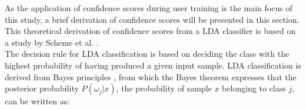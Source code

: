As the application of confidence scores during user training is the main focus of this study, a brief derivation of confidence scores will be presented in this section. This theoretical derivation of confidence scores from a LDA classifier is based on a study by Scheme et al. \cite{Scheme2013}. \\
The decision rule for LDA classification is based on deciding the class with the highest probability of having produced a given input sample. LDA classification is derived from Bayes principles \cite{Scheme2013a}, from which the Bayes theorem expresses that the posterior probability $P(\omega_{j}|x)$, the probability of sample $x$ belonging to class $j$, can be written as:

\vspace{-0.7cm}


